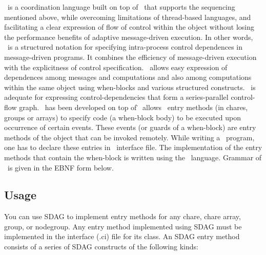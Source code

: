 \sdag\ is a coordination language built on top of \charmpp\ that supports the
sequencing mentioned above, while overcoming limitations of thread-based
languages, and facilitating a clear expression of flow of control within the
object without losing the performance benefits of adaptive message-driven
execution.  In other words, \sdag\ is a structured notation for specifying
intra-process control dependences in message-driven programs. It combines the
efficiency of message-driven execution with the explicitness of control
specification. \sdag\ allows easy expression of dependences among messages and
computations and also among computations within the same object using
when-blocks and various structured constructs.  \sdag\ is adequate for
expressing control-dependencies that form a series-parallel control-flow graph.
\sdag\ has been developed on top of \charmpp\. \sdag\ allows \charmpp\ entry
methods (in chares, groups or arrays) to specify code (a when-block body) to be
executed upon occurrence of certain events.  These events (or guards of a
when-block) are entry methods of the object that can be invoked remotely. While
writing a \sdag\ program, one has to declare these entries in \charmpp\
interface file. The implementation of the entry methods that contain the
when-block is written using the \sdag\ language. Grammar of \sdag\ is given in
the EBNF form below.

\subsection{Usage}

You can use SDAG to implement entry methods for any chare, chare array, group,
or nodegroup. Any entry method implemented using SDAG must be implemented in the
interface (.ci) file for its class. An SDAG entry method consists of a series of
SDAG constructs of the following kinds:

